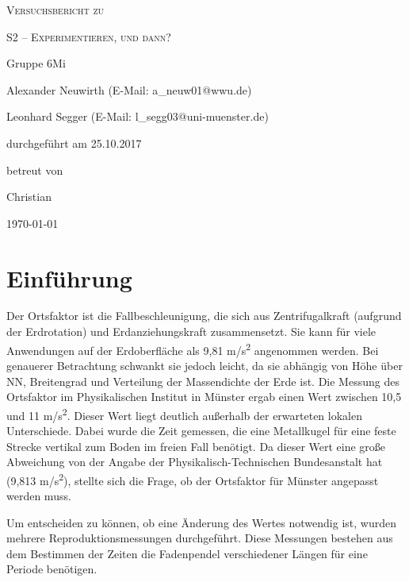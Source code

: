 \documentclass[
	a4paper,
	12pt,
	pagesize,
	ngerman
]{scrartcl}
\begin{document}
	
	\begin{titlepage}
		\centering
		{\scshape\LARGE Versuchsbericht zu \par}
		\vspace{1cm}
		{\scshape\huge S2 -- Experimentieren, und dann?\par}
		\vspace{2.5cm}
		{\LARGE Gruppe 6Mi \par}
		\vspace{0.5cm}
		
		{\large Alexander Neuwirth (E-Mail: a\_neuw01@wwu.de) \par}
		{\large Leonhard Segger (E-Mail: l\_segg03@uni-muenster.de) \par}
		\vfill
		
		durchgeführt am 25.10.2017\par
		betreut von\par
		{\large Christian} %
		
		\vfill
		
		{\large \today\par}
	\end{titlepage}
	\tableofcontents
	
	\newpage
	\section{Einführung}
	
	Der Ortsfaktor ist die Fallbeschleunigung, die sich aus Zentrifugalkraft (aufgrund der Erdrotation) und Erdanziehungskraft zusammensetzt. Sie kann für viele Anwendungen auf der Erdoberfläche als 9,81 \si{m/s^2} angenommen werden. Bei genauerer Betrachtung schwankt sie jedoch leicht, da sie abhängig von Höhe über NN, Breitengrad und Verteilung der Massendichte der Erde ist. Die Messung des Ortsfaktor im Physikalischen Institut in Münster ergab einen Wert zwischen 10,5 und 11 \si{m/s^2}. Dieser Wert liegt deutlich außerhalb der erwarteten lokalen Unterschiede. Dabei wurde die Zeit gemessen, die eine Metallkugel für eine feste Strecke vertikal zum Boden im freien Fall benötigt. Da dieser Wert eine große Abweichung von der Angabe der Physikalisch-Technischen Bundesanstalt hat (9,813 \si{m/s^2}), stellte sich die Frage, ob der Ortsfaktor für Münster angepasst werden muss.\par 
	Um entscheiden zu können, ob eine Änderung des Wertes notwendig ist, wurden mehrere Reproduktionsmessungen durchgeführt. Diese Messungen bestehen aus dem Bestimmen der Zeiten die Fadenpendel verschiedener Längen für eine Periode benötigen.  
	
\end{document}
